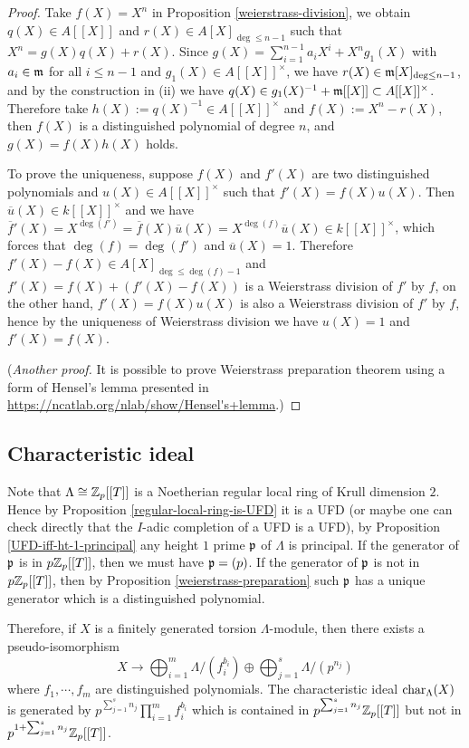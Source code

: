 \begin{proof}
Take $f(X)=X^n$ in Proposition \ref{weierstrass-division}, we obtain $q(X)\in A[[X]]$
and $r(X)\in A[X]_{\deg\leq n-1}$ such that $X^n=g(X)q(X)+r(X)$.
Since $g(X)=\sum_{i=1}^{n-1}a_iX^i+X^ng_1(X)$
with $a_i\in{\mathfrak{m}}$ for all $i\leq n-1$ and $g_1(X)\in A[[X]]^\times$,
we have $r(X)\in{\mathfrak{m}}[X]_{\deg\leq n-1}$, and by the construction in (ii)
we have $q(X)\in g_1(X)^{-1}+{\mathfrak{m}}[[X]]\subset A[[X]]^\times$.
Therefore take $h(X):=q(X)^{-1}\in A[[X]]^\times$
and $f(X):=X^n-r(X)$, then $f(X)$ is a distinguished polynomial of degree $n$,
and $g(X)=f(X)h(X)$ holds.

To prove the uniqueness, suppose $f(X)$ and $f'(X)$ are two distinguished polynomials
and $u(X)\in A[[X]]^\times$ such that $f'(X)=f(X)u(X)$.
Then $\overline u(X)\in k[[X]]^\times$ and we have
$\overline f{}'(X)=X^{\deg(f')}=\overline f(X)\overline u(X)
=X^{\deg(f)}\overline u(X)\in k[[X]]^\times$,
which forces that $\deg(f)=\deg(f')$ and $\overline u(X)=1$.
Therefore $f'(X)-f(X)\in A[X]_{\deg\leq\deg(f)-1}$
and $f'(X)=f(X)+(f'(X)-f(X))$ is a Weierstrass division of $f'$ by $f$,
on the other hand, $f'(X)=f(X)u(X)$ is also a Weierstrass division of $f'$ by $f$,
hence by the uniqueness of Weierstrass division
we have $u(X)=1$ and $f'(X)=f(X)$.

(\emph{Another proof.}
It is possible to prove Weierstrass preparation theorem using a form
of Hensel's lemma presented in \url{https://ncatlab.org/nlab/show/Hensel's+lemma}.)
\end{proof}

\subsection{Characteristic ideal}

Note that $\Lambda\cong{\mathbb {Z}}_p[[T]]$ is a
Noetherian regular local ring of Krull dimension $2$.
Hence by Proposition \ref{regular-local-ring-is-UFD} it is a UFD
(or maybe one can check directly that the $I$-adic completion of a UFD is a UFD),
by Proposition \ref{UFD-iff-ht-1-principal} any height $1$ prime ${\mathfrak{p}}$ of $\Lambda$
is principal.
If the generator of ${\mathfrak{p}}$ is in $p{\mathbb {Z}}_p[[T]]$, then
we must have ${\mathfrak{p}}=(p)$.
If the generator of ${\mathfrak{p}}$ is not in $p{\mathbb {Z}}_p[[T]]$, then
by Proposition \ref{weierstrass-preparation} such ${\mathfrak{p}}$
has a unique generator which is a distinguished polynomial.

Therefore, if $X$ is a finitely generated torsion $\Lambda$-module,
then there exists a pseudo-isomorphism
$$
X\to\bigoplus_{i=1}^m\Lambda/(f_i^{b_i})\oplus\bigoplus_{j=1}^s\Lambda/(p^{n_j})
$$
where $f_1,\cdots,f_m$ are distinguished polynomials.
The characteristic ideal $\operatorname{char}_\Lambda(X)$ is generated by
$p^{\sum_{j=1}^sn_j}\prod_{i=1}^mf_i^{b_i}$
which is contained in $p^{\sum_{j=1}^sn_j}{\mathbb {Z}}_p[[T]]$
but not in $p^{1+\sum_{j=1}^sn_j}{\mathbb {Z}}_p[[T]]$.

